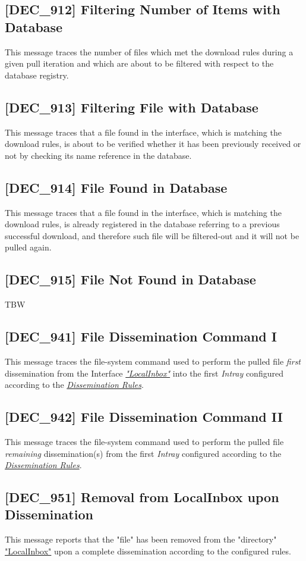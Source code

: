 \documentclass[dec_sum_main.tex]{subfiles}
\begin{document}
\label{DEC912}
\subsection{[DEC\_912] Filtering Number of Items with Database}
This message traces the number of files which met the download rules during a given pull iteration and which are about to be filtered with respect to the database registry.

\label{DEC913}
\subsection{[DEC\_913] Filtering File with Database}
This message traces that a file found in the interface, which is matching the download rules, is about to be verified whether it has been previously received or not by checking its name reference in the database. 

\label{DEC914}
\subsection{[DEC\_914] File Found in Database}
This message traces that a file found in the interface, which is matching the download rules, is already registered in the database referring to a previous successful download, and therefore such file will be filtered-out and it will not be pulled again.

\label{DEC915}
\subsection{[DEC\_915] File Not Found in Database}
TBW

\subsection{[DEC\_941] File Dissemination Command I}
\label{DEC941}
This message traces the file-system command used to perform the pulled file \textit{first} dissemination from the Interface \hyperref[LocalInbox]{\textit{"LocalInbox"}} into the first \textit{Intray} configured according to the \hyperref[Dissemination rules]{\textit{Dissemination Rules}}.

\subsection{[DEC\_942] File Dissemination Command II}
\label{DEC942}
This message traces the file-system command used to perform the pulled file \textit{remaining} dissemination(s) from the first \textit{Intray} configured according to the \hyperref[Dissemination rules]{\textit{Dissemination Rules}}.

\subsection{[DEC\_951] Removal from LocalInbox upon Dissemination}
\label{DEC951}
This message reports that the "file" has been removed from the "directory" \hyperref[LocalInbox]{"LocalInbox"} upon a complete dissemination according to the configured rules.
\end{document}
